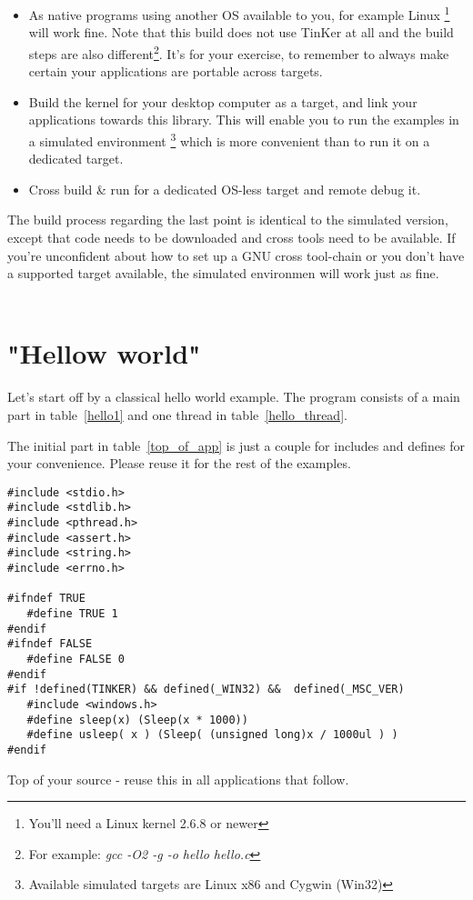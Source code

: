 \begin{itemize}
\item As native programs using another OS available to you, for example Linux \footnote{You'll need a Linux kernel 2.6.8 or newer} will work fine. Note that this build does not use TinKer at all and the build steps are also different\footnote{For example: \textit{gcc -O2 -g -o hello hello.c}}. It's for your exercise, to remember to always make certain your applications are portable across targets.
\item Build the kernel for your desktop computer as a target, and link your applications towards this library. This will enable you to run the examples in a simulated environment \footnote{Available simulated targets are Linux x86 and Cygwin (Win32)} which is more convenient than to run it on a dedicated target.
\item Cross build \& run for a dedicated OS-less target and remote debug it. 
\end{itemize}
%
The build process regarding the last point is identical to the simulated version, except that code needs to be downloaded and cross tools need to be available. If you're unconfident about how to set up a GNU cross tool-chain or you don't have a supported target available, the simulated environmen will work just as fine.
\\\\

\chapter{"Hellow world"}
Let's start off by a classical hello world example. The program consists of a main part in table~\ref{hello1} and one thread in table~\ref{hello_thread}.

The initial part in table~\ref{top_of_app} is just a couple for includes and defines for your convenience. Please reuse it for the rest of the examples.

\begin{table}[!hbp]
\begin{verbatim}
#include <stdio.h>
#include <stdlib.h>
#include <pthread.h>
#include <assert.h>
#include <string.h>
#include <errno.h>

#ifndef TRUE
   #define TRUE 1
#endif
#ifndef FALSE
   #define FALSE 0
#endif
#if !defined(TINKER) && defined(_WIN32) &&  defined(_MSC_VER)
   #include <windows.h>
   #define sleep(x) (Sleep(x * 1000))
   #define usleep( x ) (Sleep( (unsigned long)x / 1000ul ) )
#endif
\end{verbatim}
\caption{Top of your source - reuse this in all applications that follow.\label{top_of_app}}
\end{table}

